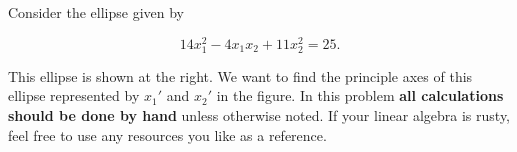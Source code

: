 \documentclass[]{homework}
\begin{document}


\begin{problem}{1}

  Consider the ellipse given by

  \vspace{-1em}
  \begin{minipage}[t]{\linewidth}
  \begin{wrapfigure}{r}{4.5cm}
    \vspace{-2.5em}
  \end{wrapfigure}

  \begin{equation}
    14 x_1^2 - 4 x_1 x_2 + 11 x_2^2 = 25.\nonumber
  \end{equation}


  This ellipse is shown at the right.  We want to find the principle axes
  of this ellipse represented by $x_1'$ and $x_2'$ in the figure.  In this
  problem \textbf{all calculations should be done by hand} unless
  otherwise noted. If your linear algebra is rusty, feel free to use 
  any resources you like as a reference.
  \end{minipage}


\end{problem}
\end{document}
